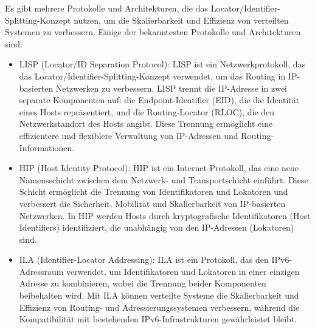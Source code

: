 Es gibt mehrere Protokolle und Architekturen, die das Locator/Identifier-Splitting-Konzept nutzen, um die Skalierbarkeit und Effizienz von verteilten Systemen zu verbessern. Einige der bekanntesten Protokolle und Architekturen sind:
\begin{itemize}
\item LISP (Locator/ID Separation Protocol): LISP ist ein Netzwerkprotokoll, das das Locator/Identifier-Splitting-Konzept verwendet, um das Routing in IP-basierten Netzwerken zu verbessern. LISP trennt die IP-Adresse in zwei separate Komponenten auf: die Endpoint-Identifier (EID), die die Identität eines Hosts repräsentiert, und die Routing-Locator (RLOC), die den Netzwerkstandort des Hosts angibt. Diese Trennung ermöglicht eine effizientere und flexiblere Verwaltung von IP-Adressen und Routing-Informationen.
\item HIP (Host Identity Protocol): HIP ist ein Internet-Protokoll, das eine neue Namensschicht zwischen dem Netzwerk- und Transportschicht einführt. Diese Schicht ermöglicht die Trennung von Identifikatoren und Lokatoren und verbessert die Sicherheit, Mobilität und Skalierbarkeit von IP-basierten Netzwerken. In HIP werden Hosts durch kryptografische Identifikatoren (Host Identifiers) identifiziert, die unabhängig von den IP-Adressen (Lokatoren) sind.
\item ILA (Identifier-Locator Addressing): ILA ist ein Protokoll, das den IPv6-Adressraum verwendet, um Identifikatoren und Lokatoren in einer einzigen Adresse zu kombinieren, wobei die Trennung beider Komponenten beibehalten wird. Mit ILA können verteilte Systeme die Skalierbarkeit und Effizienz von Routing- und Adressierungssystemen verbessern, während die Kompatibilität mit bestehenden IPv6-Infrastrukturen gewährleistet bleibt.
\end{itemize} 

